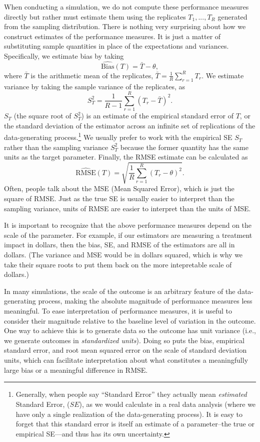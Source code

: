 \documentclass[
]{book}
\newcommand{\Bias}{\text{Bias}}
\newcommand{\RMSE}{\text{RMSE}}
\begin{document}
When conducting a simulation, we do not compute these performance measures directly but rather must estimate them using the replicates \(T_1,...,T_R\) generated from the sampling distribution.
There is nothing very surprising about how we construct estimates of the performance measures.
It is just a matter of substituting sample quantities in place of the expectations and variances.
Specifically, we estimate bias by taking
\[
\widehat{\Bias}(T) = \bar{T} - \theta, 
\label{eq:bias-estimator}
\]
where \(\bar{T}\) is the arithmetic mean of the replicates, \(\bar{T} = \frac{1}{R}\sum_{r=1}^R T_r\).
We estimate variance by taking the sample variance of the replicates, as
\[
S_T^2 = \frac{1}{R - 1}\sum_{r=1}^R \left(T_r - \bar{T}\right)^2. 
\label{eq:var-estimator}
\]
\(S_T\) (the square root of \(S^2_T\)) is an estimate of the empirical standard error of \(T\), or the standard deviation of the estimator across an infinite set of replications of the data-generating process.\footnote{Generally, when people say ``Standard Error'' they actually mean \emph{estimated} Standard Error, (\(\widehat{SE}\)), as we would calculate in a real data analysis (where we have only a single realization of the data-generating process). It is easy to forget that this standard error is itself an estimate of a parameter--the true or empirical SE---and thus has its own uncertainty.}
We usually prefer to work with the empirical SE \(S_T\) rather than the sampling variance \(S_T^2\) because the former quantity has the same units as the target parameter.
Finally, the RMSE estimate can be calculated as
\[ 
\widehat{\RMSE}(T) = \sqrt{\frac{1}{R} \sum_{r = 1}^R \left( T_r - \theta\right)^2 }.  
\label{eq:rmse-estimator}
\]
Often, people talk about the MSE (Mean Squared Error), which is just the square of RMSE.
Just as the true SE is usually easier to interpret than the sampling variance, units of RMSE are easier to interpret than the units of MSE.

It is important to recognize that the above performance measures depend on the scale of the parameter.
For example, if our estimators are measuring a treatment impact in dollars, then the bias, SE, and RMSE of the estimators are all in dollars.
(The variance and MSE would be in dollars squared, which is why we take their square roots to put them back on the more intepretable scale of dollars.)

In many simulations, the scale of the outcome is an arbitrary feature of the data-generating process, making the absolute magnitude of performance measures less meaningful.
To ease interpretation of performance measures, it is useful to consider their magnitude relative to the baseline level of variation in the outcome.
One way to achieve this is to generate data so the outcome has unit variance (i.e., we generate outcomes in \emph{standardized units}).
Doing so puts the bias, empirical standard error, and root mean squared error on the scale of standard deviation units, which can facilitate interpretation about what constitutes a meaningfully large bias or a meaningful difference in RMSE.
\end{document}
